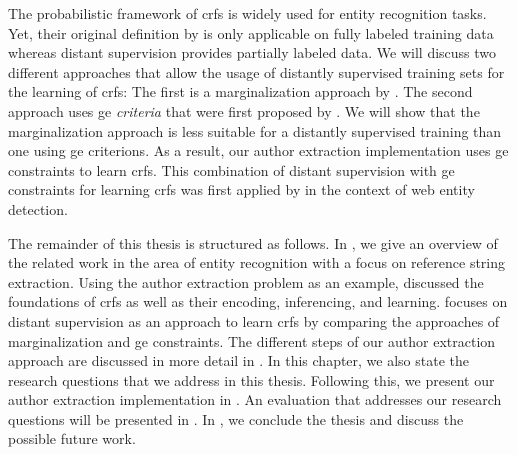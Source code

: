 The probabilistic framework of \glspl{crf} is widely used for entity recognition tasks.
Yet, their original definition by \citet{lafferty2001conditional} is only applicable on fully labeled training data whereas distant supervision provides partially labeled data.
We will discuss two different approaches that allow the usage of distantly supervised training sets for the learning of \glspl{crf}:
The first is a marginalization approach by \citet{tsuboi2008training}.
The second approach uses \gls{ge} \textit{criteria} that were first proposed by \citet{mann2007simple}.
We will show that the marginalization approach is less suitable for a distantly supervised training than one using \glspl{ge criterion}.
As a result, our author extraction implementation uses \glspl{ge constraint} to learn \glspl{crf}.
This combination of distant supervision with \glspl{ge constraint} for learning \glspl{crf} was first applied by \citet{lu2013web} in the context of web entity detection.

\bigskip

The remainder of this thesis is structured as follows.
In , we give an overview of the related work in the area of entity recognition with a focus on reference string extraction.
Using the author extraction problem as an example,  discussed the foundations of \glspl{crf} as well as their encoding, inferencing, and learning.
 focuses on distant supervision as an approach to learn \glspl{crf} by comparing the approaches of marginalization and \gls{ge} constraints.
The different steps of our author extraction approach are discussed in more detail in .
In this chapter, we also state the research questions that we address in this thesis.
Following this, we present our author extraction implementation in .
An evaluation that addresses our research questions will be presented in .
In , we conclude the thesis and discuss the possible future work.

